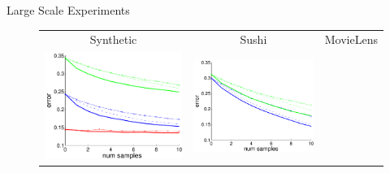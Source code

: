 \documentclass[final]{beamer}
\newlength{\onecolwid}
\begin{document}
\begin{frame}[t]
\begin{columns}[t]
\begin{column}{\onecolwid}
        \begin{block}{Large Scale Experiments}
          
          \begin{figure}[h!]
          \centering
          \begin{tabular}{ccc}
          Synthetic&
          Sushi&
          MovieLens\\
          \includegraphics[scale=0.75]{figs/error_syntheticDataLargeScale.pdf}&
          \includegraphics[scale=0.75]{figs/error_sushiDataLargeScale.pdf}&

\end{tabular}
\end{figure}
\end{block}
\end{column}
\end{columns}
\end{frame}
\end{document}

